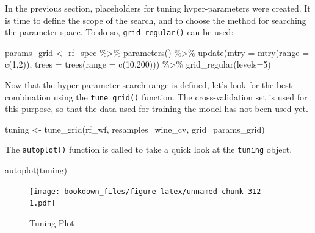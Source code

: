 \documentclass[
]{krantz}
\makeatletter
\newenvironment{Shaded}{\begin{snugshade}}{\end{snugshade}}
\newcommand{\AttributeTok}[1]{\textcolor[rgb]{0.61,0.61,0.61}{#1}}
\newcommand{\DecValTok}[1]{\textcolor[rgb]{0.06,0.06,0.06}{#1}}
\newcommand{\FunctionTok}[1]{\textcolor[rgb]{0,0,0}{#1}}
\newcommand{\NormalTok}[1]{#1}
\newcommand{\OtherTok}[1]{\textcolor[rgb]{0.37,0.37,0.37}{#1}}
\newcommand{\SpecialCharTok}[1]{\textcolor[rgb]{0,0,0}{#1}}
\newenvironment{kframe}{%
\medskip{}
\setlength{\fboxsep}{.8em}
 \def\at@end@of@kframe{}%
 \ifinner\ifhmode%
  \def\at@end@of@kframe{\end{minipage}}%
  \begin{minipage}{\columnwidth}%
 \fi\fi%
 \def\FrameCommand##1{\hskip\@totalleftmargin \hskip-\fboxsep
 \colorbox{shadecolor}{##1}\hskip-\fboxsep
     \hskip-\linewidth \hskip-\@totalleftmargin \hskip\columnwidth}%
 \MakeFramed {\advance\hsize-\width
   \@totalleftmargin\z@ \linewidth\hsize
   \@setminipage}}%
 {\par\unskip\endMakeFramed%
 \at@end@of@kframe}
\renewenvironment{Shaded}{\begin{kframe}}{\end{kframe}}
\makeatother
\begin{document}
In the previous section, placeholders for tuning hyper-parameters were created. It is time to define the scope of the search, and to choose the method for searching the parameter space. To do so, \texttt{grid\_regular()} can be used:

\begin{Shaded}
\begin{Highlighting}[]
\NormalTok{params\_grid }\OtherTok{\textless{}{-}}\NormalTok{ rf\_spec }\SpecialCharTok{\%\textgreater{}\%}
  \FunctionTok{parameters}\NormalTok{() }\SpecialCharTok{\%\textgreater{}\%}
  \FunctionTok{update}\NormalTok{(}\AttributeTok{mtry =} \FunctionTok{mtry}\NormalTok{(}\AttributeTok{range =} \FunctionTok{c}\NormalTok{(}\DecValTok{1}\NormalTok{,}\DecValTok{2}\NormalTok{)),}
         \AttributeTok{trees =} \FunctionTok{trees}\NormalTok{(}\AttributeTok{range =} \FunctionTok{c}\NormalTok{(}\DecValTok{10}\NormalTok{,}\DecValTok{200}\NormalTok{))) }\SpecialCharTok{\%\textgreater{}\%} 
  \FunctionTok{grid\_regular}\NormalTok{(}\AttributeTok{levels=}\DecValTok{5}\NormalTok{)}
\end{Highlighting}
\end{Shaded}

Now that the hyper-parameter search range is defined, let's look for the best combination using the \texttt{tune\_grid()} function. The cross-validation set is used for this purpose, so that the data used for training the model has not been used yet.

\begin{Shaded}
\begin{Highlighting}[]
\NormalTok{tuning }\OtherTok{\textless{}{-}} \FunctionTok{tune\_grid}\NormalTok{(rf\_wf, }\AttributeTok{resamples=}\NormalTok{wine\_cv, }\AttributeTok{grid=}\NormalTok{params\_grid)}
\end{Highlighting}
\end{Shaded}

The \texttt{autoplot()} function is called to take a quick look at the \texttt{tuning} object.

\begin{Shaded}
\begin{Highlighting}[]
\FunctionTok{autoplot}\NormalTok{(tuning)}
\end{Highlighting}
\end{Shaded}

\begin{figure}
\centering
\texttt{[image: bookdown\_files/figure-latex/unnamed-chunk-312-1.pdf]}
\caption{\label{fig:unnamed-chunk-312}Tuning Plot}
\end{figure}
\end{document}
